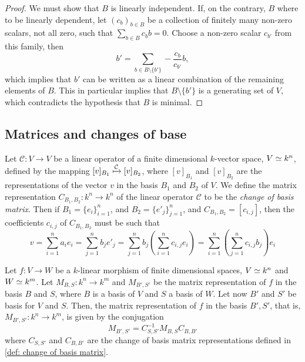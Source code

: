 \begin{proof}
We must show that \(B\) is linearly independent. If, on the contrary, \(B\)
where to be linearly dependent, let \((c_b)_{b \in B}\) be a collection of
finitely many non-zero scalars, not all zero, such that \(\sum_{b \in B} c_b b =
0\). Choose a non-zero scalar \(c_{b'}\) from this family, then
\[
b' = \sum_{b \in B \setminus \{b'\}} - \frac{c_{b}}{c_{b'}} b,
\]
which implies that \(b'\) can be written as a linear combination of the
remaining elements of \(B\). This in particular implies that \(B \setminus
\{b'\}\) is a generating set of \(V\), which contradicts the hypothesis that
\(B\) is minimal.
\end{proof}

\subsection{Matrices and changes of base}

\begin{definition}
\label{def: change of basis matrix}
Let \(\mathcal C : V \to V\) be a linear operator of a finite dimensional
\(k\)-vector space, \(V \simeq k^n\), defined by the mapping \([v]_{B_1}
\xmapsto{\mathcal C} [v]_{B_2}\), where \([v]_{B_1}\) and \([v]_{B_2}\) are the
representations of the vector \(v\) in the basis \(B_1\) and \(B_2\) of \(V\).
We define the matrix representation \(C_{B_1, B_2} : k^n \to k^n\) of the
linear operator \(\mathcal C\) to be the \emph{change of basis matrix}. Then
if \(B_1 = \{e_i\}_{i=1}^n\), and \(B_2 = \{e'_j\}_{j=1}^n\), and \(C_{B_1,
B_2} = [c_{i, j}]\), then the coefficients \(c_{i, j}\) of \(C_{B_1, B_2}\)
must be such that
\[
  v = \sum_{i=1}^n a_i e_i = \sum_{j=1}^n b_j e'_j
  = \sum_{j=1}^n b_j \left( \sum_{i=1}^n c_{i, j} e_i \right)
  = \sum_{i=1}^n \left( \sum_{j=1}^n c_{i, j} b_j \right) e_i
\]
\end{definition}

\begin{proposition}
\label{prop: change of basis, linear morphism}
Let \(f : V \to W\) be a \(k\)-linear morphism of finite dimensional spaces,
\(V \simeq k^n\) and \(W \simeq k^m\). Let \(M_{B, S} : k^n \to k^m\) and \(M_{B',
S'}\) be the matrix representation of \(f\) in the basis \(B\) and \(S\),
where \(B\) is a basis of \(V\) and \(S\) a basis of \(W\). Let now \(B'\) and
\(S'\) be basis for \(V\) and \(S\). Then, the matrix representation of \(f\)
in the basis \(B', S'\), that is, \(M_{B', S'} : k^n \to k^m\), is given by
the conjugation
\[
  M_{B', S'} = C_{S, S'}^{-1} M_{B, S} C_{B, B'}
\]
where \(C_{S, S'}\) and \(C_{B, B'}\) are the change of basis matrix
representations defined in \cref{def: change of basis matrix}.
\end{proposition}

